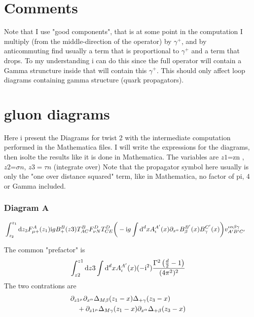 \ifdefined\mainprogram{}
\else

\fi

\section{Comments}
Note that I use "good components", that is at some point in the computation I multiply (from the middle-direction of the operator) by $\gamma^+$, and by anticommuting find usually a term that is proportional to $\gamma^+$ and a term that drops. To my understanding i can do this since the full operator will contain a Gamma struncture inside that will contain this $\gamma^+$. This should only affect loop diagrams containing gamma structure (quark propagators).

\section{gluon diagrams}

Here i present the Diagrams for twist 2 with the intermediate computation performed in the Mathematica files.
I will write the expressions for the diagrams, then isolte the results like it is done in Mathematica.
The variables are
$z1$=zn , $z2$=$\sigma n $, $z3=\tau n$ (integrate over)
Note that the propagator symbol here usually is only the "one over distance squared" term, like in Mathematica, no factor of pi, 4 or Gamma included.
\subsubsection{Diagram A}
\begin{align}
&\int_{z_2}^{z_1}\text{d} z_3F_{\mu +}^{A}(z_1)\text{i} g B_+^B(z3)  T^B_{AC}F _{\nu N}^D T^D_{CE}\bigg(-\text{i} g \int \text{d} ^d xA_\iota^{A'}(x) \partial_{x^\alpha} B_\beta^{B'} (x) B_\gamma^{C'}(x) \bigg) v^{\iota \alpha\beta\gamma}_{A'B'C'}
\end{align}

The common "prefactor" is
\begin{align}
	\int_{z2}^{z1} \text{d} z3 \int \text{d} ^d x A_\iota^{A'}(x) (- \text{i} ^2) \frac{\Gamma^2\left(\frac{d}{2}-1\right)}{(4\pi^2)^2}
\end{align}
The two contrations are
\begin{align}
	&\partial_{z1^{\mu}}\partial_{x^{\alpha}}\Delta_{M\beta}(z_1 -x )\Delta_{+\gamma}(z_3 -x )
	\\&~~~
	+\partial_{z1^{\mu}}\Delta_{M\gamma}(z_1 -x )\partial_{x^{\alpha}}\Delta_{+\beta}(z_3 -x )
\end{align}

